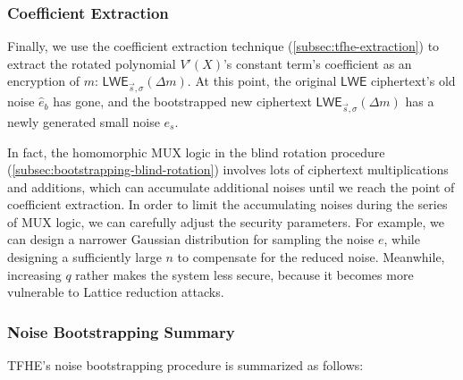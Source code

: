 \subsubsection{Coefficient Extraction}

Finally, we use the coefficient extraction technique (\autoref{subsec:tfhe-extraction}) to extract the rotated polynomial $V'(X)$'s constant term's coefficient as an encryption of $m$: $\textsf{LWE}_{\vec{s}, \sigma}(\Delta m)$. At this point, the original $\textsf{LWE}$ ciphertext's old noise $\hat{e}_b$ has gone, and the bootstrapped new ciphertext $\textsf{LWE}_{\vec{s}, \sigma}(\Delta m)$ has a newly generated small noise $e_s$. 

In fact, the homomorphic MUX logic in the blind rotation procedure (\autoref{subsec:bootstrapping-blind-rotation}) involves lots of ciphertext multiplications and additions, which can accumulate additional noises until we reach the point of coefficient extraction. In order to limit the accumulating noises during the series of MUX logic, we can carefully adjust the security parameters. For example, we can design a narrower Gaussian distribution for sampling the noise $e$, while designing a sufficiently large $n$ to compensate for the reduced noise. Meanwhile, increasing $q$ rather makes the system less secure, because it becomes more vulnerable to Lattice reduction attacks. 






\subsubsection{Noise Bootstrapping Summary}
\label{subsec:tfhe-summary}

TFHE's noise bootstrapping procedure is summarized as follows:

